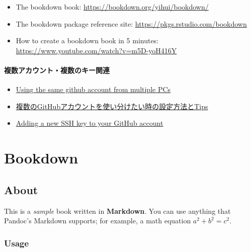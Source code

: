 \documentclass[
]{bxjsbook}
\providecommand{\tightlist}{%
  \setlength{\itemsep}{0pt}\setlength{\parskip}{0pt}}
\theoremstyle{definition}
\theoremstyle{definition}
\theoremstyle{definition}
\theoremstyle{definition}
\theoremstyle{remark}
\begin{document}
\begin{itemize}
\item
  The bookdown book: \url{https://bookdown.org/yihui/bookdown/}
\item
  The bookdown package reference site: \url{https://pkgs.rstudio.com/bookdown}
\item
  How to create a bookdown book in 5 minutes: \url{https://www.youtube.com/watch?v=m5D-yoH416Y}
\end{itemize}

\hypertarget{ux8907ux6570ux30a2ux30abux30a6ux30f3ux30c8ux8907ux6570ux306eux30adux30fcux95a2ux9023}{%
\paragraph{複数アカウント・複数のキー関連}\label{ux8907ux6570ux30a2ux30abux30a6ux30f3ux30c8ux8907ux6570ux306eux30adux30fcux95a2ux9023}}

\begin{itemize}
\tightlist
\item
  \href{https://serverfault.com/questions/206907/using-the-same-github-account-from-multiple-pcs}{Using the same github account from multiple PCs}
\item
  \href{https://zenn.dev/taichifukumoto/articles/how-to-use-multiple-github-accounts}{複数のGitHubアカウントを使い分けたい時の設定方法とTips}
\item
  \href{https://docs.github.com/en/authentication/connecting-to-github-with-ssh/adding-a-new-ssh-key-to-your-github-account}{Adding a new SSH key to your GitHub account}
\end{itemize}

\hypertarget{bookdown}{%
\section{Bookdown}\label{bookdown}}

\hypertarget{about}{%
\subsection{About}\label{about}}

This is a \emph{sample} book written in \textbf{Markdown}. You can use anything that Pandoc's Markdown supports; for example, a math equation \(a^2 + b^2 = c^2\).

\hypertarget{usage}{%
\subsubsection{Usage}\label{usage}}
\end{document}
